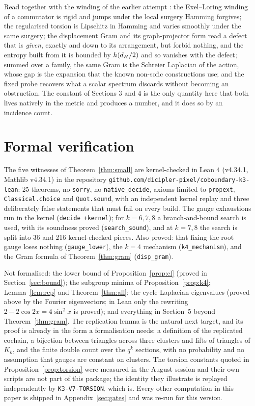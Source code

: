 \documentclass[11pt]{article}
\theoremstyle{remark}\newtheorem{remark}[theorem]{Remark}
\begin{document}
Read together with the winding of the earlier attempt \cite{trace}: the Exel--Loring winding of a commutator is rigid and jumps under the local surgery Hamming forgives; the regularised torsion is Lipschitz in Hamming and varies smoothly under the same surgery; the displacement Gram and its graph-projector form read a defect that is \emph{given}, exactly and down to its arrangement, but forbid nothing, and the entropy built from it is bounded by $h(d_H/2)$ and so vanishes with the defect; summed over a family, the same Gram is the Schreier Laplacian of the action, whose gap is the expansion that the known non-sofic constructions use; and the fixed probe recovers what a scalar spectrum discards without becoming an obstruction. The constant of Sections 3 and 4 is the only quantity here that both lives natively in the metric and produces a number, and it does so by an incidence count.

\section{Formal verification}\label{sec:lean}
The five witnesses of Theorem~\ref{thm:small} are kernel-checked in Lean 4 (v4.34.1, Mathlib v4.34.1) in the repository \texttt{github.com/dicipler-pixel/coboundary-k3-lean}: 25 theorems, no \texttt{sorry}, no \texttt{native\_decide}, axioms limited to \texttt{propext}, \texttt{Classical.choice} and \texttt{Quot.sound}, with an independent kernel replay and three deliberately false statements that must fail on every build. The gauge exhaustions run in the kernel (\texttt{decide +kernel}); for $k=6,7,8$ a branch-and-bound search is used, with its soundness proved (\texttt{search\_sound}), and at $k=7,8$ the search is split into 36 and 216 kernel-checked pieces. Also proved: that fixing the root gauge loses nothing (\texttt{gauge\_lower}), the $k=4$ mechanism (\texttt{k4\_mechanism}), and the Gram formula of Theorem~\ref{thm:gram} (\texttt{disp\_gram}).

Not formalised: the lower bound of Proposition~\ref{prop:cl} (proved in Section~\ref{sec:bound}); the subgroup minima of Proposition~\ref{prop:k4}; Lemma~\ref{lem:rep} and Theorem~\ref{thm:all}; the cycle-Laplacian eigenvalues (proved above by the Fourier eigenvectors; in Lean only the rewriting $2-2\cos2x=4\sin^2x$ is proved); and everything in Section~5 beyond Theorem~\ref{thm:gram}. The replication lemma is the natural next target, and its proof is already in the form a formalisation needs: a definition of the replicated cochain, a bijection between triangles across three clusters and lifts of triangles of $K_k$, and the finite double count over the $q^k$ sections, with no probability and no assumption that gauges are constant on clusters. The torsion constants quoted in Proposition~\ref{prop:torsion} were measured in the August session and their own scripts are not part of this package; the identity they illustrate is replayed independently by \texttt{K3-V7-TORSION}, which is. Every other computation in this paper is shipped in Appendix~\ref{sec:gates} and was re-run for this version.
\end{document}
